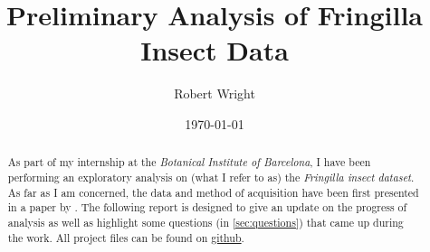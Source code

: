 \documentclass{scrartcl}
\title{Preliminary Analysis of Fringilla Insect Data}
\author{Robert Wright}
\date{\today}
\begin{document}
	\maketitle
	
	\begin{abstract}
		\noindent
		As part of my internship at the \textit{Botanical Institute of Barcelona}, I have been performing an exploratory analysis on (what I refer to as) the \textit{Fringilla insect dataset}. As far as I am concerned, the data and method of acquisition have been \newline first presented in a paper by \textcite{shapoval2012}. The following report is designed to give an update on the progress of analysis as well as highlight some questions (in \cref{sec:questions}) that came up during the work. All project files can be found on \href{https://github.com/gtlab-barcelona/Robert}{github}.
	\end{abstract}
	\newpage
	\tableofcontents
	
	
	
	
	\appendix
	
	
	\newpage
	\hypersetup{urlcolor=.}
	\begingroup
	\setlength{\emergencystretch}{3em}
	\printbibliography
	\endgroup
\end{document}

